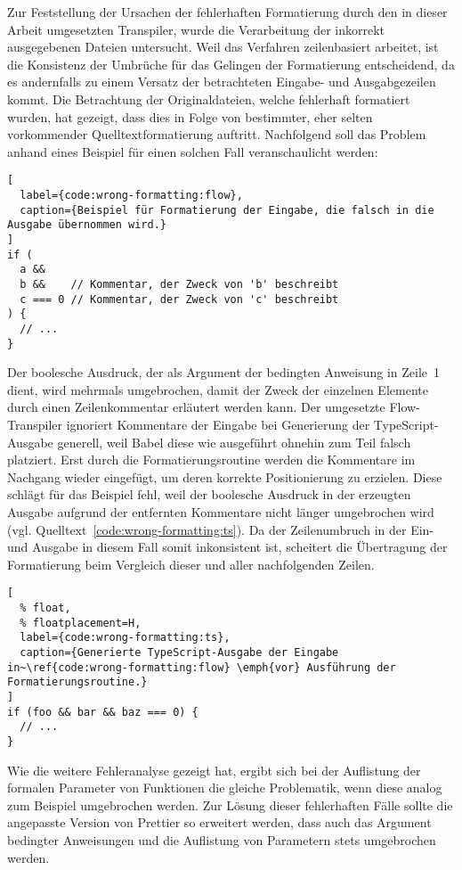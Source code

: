 Zur Feststellung der Ursachen der fehlerhaften Formatierung durch den in dieser Arbeit umgesetzten Transpiler, wurde die Verarbeitung der inkorrekt ausgegebenen Dateien untersucht. Weil das Verfahren zeilenbasiert arbeitet, ist die Konsistenz der Umbrüche für das Gelingen der Formatierung entscheidend, da es andernfalls zu einem Versatz der betrachteten Eingabe- und Ausgabgezeilen kommt. Die Betrachtung der Originaldateien, welche fehlerhaft formatiert wurden, hat gezeigt, dass dies in Folge von bestimmter, eher selten vorkommender Quelltextformatierung auftritt. Nachfolgend soll das Problem anhand eines Beispiel für einen solchen Fall veranschaulicht werden:

\begin{lstlisting}[
  label={code:wrong-formatting:flow},
  caption={Beispiel für Formatierung der Eingabe, die falsch in die Ausgabe übernommen wird.}
]
if (
  a &&
  b &&    // Kommentar, der Zweck von 'b' beschreibt
  c === 0 // Kommentar, der Zweck von 'c' beschreibt
) {
  // ...
}
\end{lstlisting}

Der boolesche Ausdruck, der als Argument der bedingten Anweisung in Zeile~1 dient, wird mehrmals umgebrochen, damit der Zweck der einzelnen Elemente durch einen Zeilenkommentar erläutert werden kann. Der umgesetzte Flow-Transpiler ignoriert Kommentare der Eingabe bei Generierung der TypeScript-Ausgabe generell, weil Babel diese wie ausgeführt ohnehin zum Teil falsch platziert. Erst durch die Formatierungsroutine werden die Kommentare im Nachgang wieder eingefügt, um deren korrekte Positionierung zu erzielen. Diese schlägt für das Beispiel fehl, weil der boolesche Ausdruck in der erzeugten Ausgabe aufgrund der entfernten Kommentare nicht länger umgebrochen wird (vgl. Quelltext~\ref{code:wrong-formatting:ts}). Da der Zeilenumbruch in der Ein- und Ausgabe in diesem Fall somit inkonsistent ist, scheitert die Übertragung der Formatierung beim Vergleich dieser und aller nachfolgenden Zeilen.

\begin{lstlisting}[
  % float,
  % floatplacement=H,
  label={code:wrong-formatting:ts},
  caption={Generierte TypeScript-Ausgabe der Eingabe in~\ref{code:wrong-formatting:flow} \emph{vor} Ausführung der Formatierungsroutine.}
]
if (foo && bar && baz === 0) {
  // ...
}
\end{lstlisting}

Wie die weitere Fehleranalyse gezeigt hat, ergibt sich bei der Auflistung der formalen Parameter von Funktionen die gleiche Problematik, wenn diese analog zum Beispiel umgebrochen werden. Zur Lösung dieser fehlerhaften Fälle sollte die angepasste Version von Prettier so erweitert werden, dass auch das Argument bedingter Anweisungen und die Auflistung  von Parametern stets umgebrochen werden.

